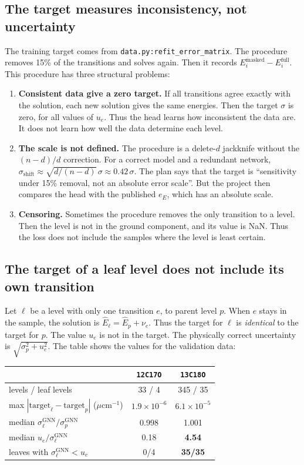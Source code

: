 \documentclass[11pt,a4paper]{article}
\newcommand{\code}[1]{\texttt{#1}}
\newcommand{\ucm}{\ensuremath{\mu\mathrm{cm}^{-1}}}
\begin{document}
\subsection{The target measures inconsistency, not uncertainty}
The training target comes from \code{data.py:refit\_error\_matrix}. The procedure
removes 15\% of the transitions and solves again. Then it records
$E_i^{\mathrm{masked}} - E_i^{\mathrm{full}}$. This procedure has three structural
problems:
\begin{enumerate}
\item \textbf{Consistent data give a zero target.} If all transitions agree exactly
  with the solution, each new solution gives the same energies. Then the target
  $\sigma$ is zero, for all values of $u_e$. Thus the head learns how inconsistent the
  data are. It does not learn how well the data determine each level.
\item \textbf{The scale is not defined.} The procedure is a delete-$d$ jackknife
  without the $(n-d)/d$ correction. For a correct model and a redundant network,
  $\sigma_{\mathrm{shift}} \approx \sqrt{d/(n-d)}\,\sigma \approx 0.42\,\sigma$. The plan
  says that the target is ``sensitivity under 15\% removal, not an absolute error
  scale''. But the project then compares the head with the published $e_E$, which has
  an absolute scale.
\item \textbf{Censoring.} Sometimes the procedure removes the only transition to a
  level. Then the level is not in the ground component, and its value is NaN. Thus the
  loss does not include the samples where the level is least certain.
\end{enumerate}

\subsection{The target of a leaf level does not include its own transition}\label{sec:leaf}
Let $\ell$ be a level with only one transition $e$, to parent level $p$. When $e$
stays in the sample, the solution is $\hat E_\ell = \hat E_p + \nu_e$. Thus the target
for $\ell$ is \emph{identical} to the target for $p$. The value $u_e$ is not in the
target. The physically correct uncertainty is $\sqrt{\sigma_p^2 + u_e^2}$. The table
shows the values for the validation data:

\begin{center}\small
\begin{tabular}{@{}lcc@{}}
\toprule
 & \code{12C17O} & \code{13C18O} \\
\midrule
levels / leaf levels & 33 / 4 & 345 / 35 \\
max $|\text{target}_\ell - \text{target}_p|$ (\ucm) & $1.9\times10^{-6}$ & $6.1\times10^{-5}$ \\
median $\sigma^{\mathrm{GNN}}_\ell / \sigma^{\mathrm{GNN}}_p$ & 0.998 & 1.001 \\
median $u_e / \sigma^{\mathrm{GNN}}_\ell$ & 0.18 & \textbf{4.54} \\
leaves with $\sigma^{\mathrm{GNN}}_\ell < u_e$ & 0/4 & \textbf{35/35} \\
\bottomrule
\end{tabular}
\end{center}
\end{document}

